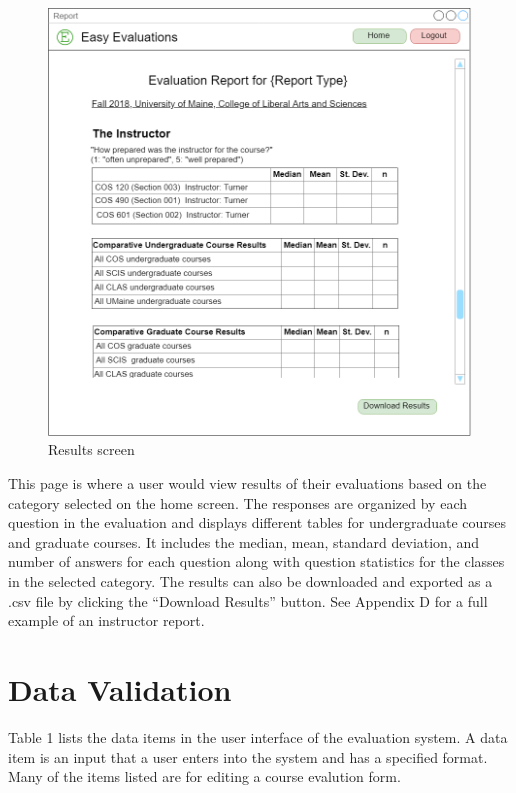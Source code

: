 \documentclass{article}
\begin{document}
\begin{center}
\begin{figure}[H]
    \centering
    \caption{Results screen}
    \includegraphics[width=6.5in]{images/report_screen.png}
\end{figure}
\end{center}

This page is where a user would view results of their evaluations based on the category selected on the home screen.  The responses are organized by each question in the evaluation and displays different tables for undergraduate courses and graduate courses. It includes the median, mean, standard deviation, and number of answers for each question along with question statistics for the classes in the selected category. The results can also be downloaded and exported as a .csv file by clicking the ``Download Results'' button. See Appendix D for a full example of an instructor report.

\newpage

\section{Data Validation}

Table 1 lists the data items in the user interface of the evaluation system. A data item is an input that a user enters into the system and has a specified format. Many of the items listed are for editing a course evalution form.
\end{document}
